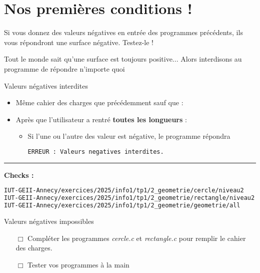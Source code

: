 \section{Nos premières conditions !}

Si vous donnez des valeurs négatives en entrée des programmes précédents, ils vous répondront une surface négative. Testez-le !

Tout le monde sait qu'une surface est toujours positive... Alors interdisons au programme de répondre n'importe quoi

\begin{UPSTIcahierDesCharges}{Valeurs négatives interdites}
	\begin{itemize}
		\item Même cahier des charges que précédemment sauf que :
		\item Après que l'utilisateur a rentré \textbf{toutes les longueurs} :
		      \begin{itemize}
			      \item Si l'une ou l'autre des valeur est négative, le programme répondra
			            \begin{lstlisting}[language=bash,style=console]
		ERREUR : Valeurs negatives interdites.
\end{lstlisting}
		      \end{itemize}
	\end{itemize}
	\hrule
	\textbf{Checks :}
	\begin{lstlisting}[language=bash,style=console]
IUT-GEII-Annecy/exercices/2025/info1/tp1/2_geometrie/cercle/niveau2
IUT-GEII-Annecy/exercices/2025/info1/tp1/2_geometrie/rectangle/niveau2
IUT-GEII-Annecy/exercices/2025/info1/tp1/2_geometrie/geometrie/all
\end{lstlisting}
\end{UPSTIcahierDesCharges}



\begin{UPSTIManipulation}{Valeurs négatives impossibles}
	\begin{itemize}
		\item[$\Box$] Compléter les programmes \textit{cercle.c} et \textit{rectangle.c} pour remplir le cahier des charges.
		\item[$\Box$] Tester vos programmes à la main
	\end{itemize}
\end{UPSTIManipulation}